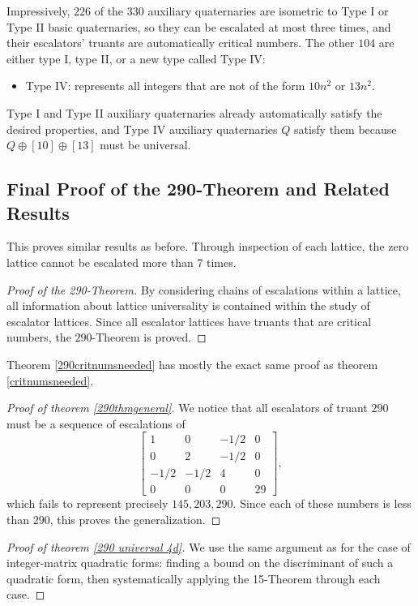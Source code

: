 \documentclass[letterpaper, 12pt]{article}
\begin{document}
Impressively, $226$ of the $330$ auxiliary quaternaries are isometric to Type I or Type II basic quaternaries, so they can be escalated at most three times, and their escalators' truants are automatically critical numbers. The other $104$ are either type I, type II, or a new type called Type IV:
\begin{itemize}
    \item Type IV: represents all integers that are not of the form $10n^2$ or $13n^2$.
\end{itemize}
Type I and Type II auxiliary quaternaries already automatically satisfy the desired properties, and Type IV auxiliary quaternaries $Q$ satisfy them because $Q \oplus [10] \oplus [13]$ must be universal.

\subsection{Final Proof of the 290-Theorem and Related Results}
This proves similar results as before. Through inspection of each lattice, the zero lattice cannot be escalated more than $7$ times.

\begin{proof}[Proof of the 290-Theorem]
    By considering chains of escalations within a lattice, all information about lattice universality is contained within the study of escalator lattices. Since all escalator lattices have truants that are critical numbers, the $290$-Theorem is proved.
\end{proof}

Theorem \ref{290critnumsneeded} has mostly the exact same proof as theorem \ref{critnumsneeded}.

\begin{proof}[Proof of theorem \ref{290thmgeneral}]
    We notice that all escalators of truant $290$ must be a sequence of escalations of
    \[\begin{bmatrix}
    1 & 0 & -1/2 & 0 \\
    0 & 2 & -1/2 & 0 \\
    -1/2 & -1/2 & 4 & 0 \\
    0 & 0 & 0 & 29
    \end{bmatrix},\]
    which fails to represent precisely $145, 203, 290$. Since each of these numbers is less than $290$, this proves the generalization.
\end{proof}

\begin{proof}[Proof of theorem \ref{290 universal 4d}]
    We use the same argument as for the case of integer-matrix quadratic forms: finding a bound on the discriminant of such a quadratic form, then systematically applying the 15-Theorem through each case.
\end{proof}
\end{document}
